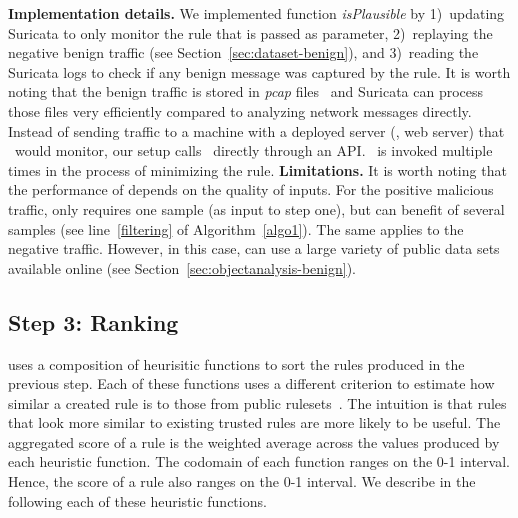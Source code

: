 \documentclass[sigconf,review, anonymous]{acmart}
\begin{document}
\textbf{Implementation details.} We implemented function
\emph{isPlausible} by 1)~updating Suricata to only monitor the rule
that is passed as parameter, 2)~replaying the negative benign traffic (see
Section~\ref{sec:dataset-benign}), and 3)~reading the Suricata logs to
check if any benign message was captured by the rule.  It is worth
noting that the benign traffic is stored in \emph{pcap}
files~\cite{pcap} and Suricata can process those files very
efficiently compared to analyzing network messages directly. Instead
of sending traffic to a machine with a deployed server (\eg{}, web
server) that \suri\ would monitor, our setup calls \suri\ directly
through an API. \suri\ is invoked multiple times in the process of
minimizing the rule.  \textbf{Limitations.} It is worth noting that
the performance of \tname{} depends on the quality of inputs. For the
positive malicious traffic, \tname{} only requires one sample (as
input to step one), but can benefit of several samples (see
line~\ref{filtering} of Algorithm~\ref{algo1}). The same applies to
the negative traffic. However, in this case, \tname{} can use a large
variety of public data sets available online (see
Section~\ref{sec:objectanalysis-benign}).

\subsection{Step 3: Ranking}
\label{sec:ranking}

\tname{} uses a composition of heurisitic functions to sort the rules
produced in the previous step. Each of these functions uses a
different criterion to estimate how similar a created rule is to those
from public rulesets~\cite{emerging-threats-open}. The intuition is
that rules that look more similar to existing trusted rules are more
likely to be useful. The aggregated score of a rule is the weighted
average across the values produced by each heuristic function. The
codomain of each function ranges on the 0-1 interval. Hence, the score
of a rule also ranges on the 0-1 interval. We describe in the
following each of these heuristic functions.

\end{document}
